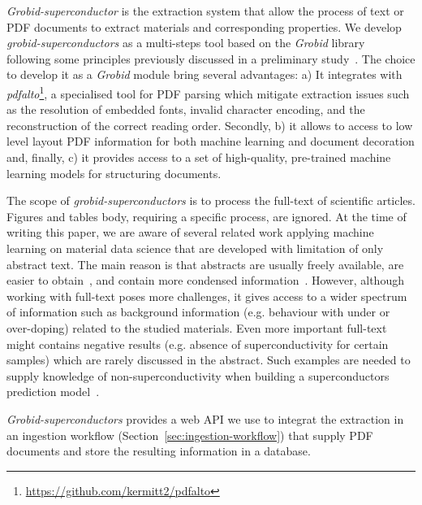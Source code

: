 \documentclass{article}
\begin{document}
\textit{Grobid-superconductor} is the extraction system that allow the process of text or PDF documents to extract materials and corresponding properties. 
We develop \textit{grobid-superconductors} as a multi-steps tool based on the \textit{Grobid} library~\cite{GROBID} following some principles previously discussed in a preliminary study~\cite{foppiano:hal-02870896}.  
The choice to develop it as a \textit{Grobid} module bring several advantages: a) It integrates with \textit{pdfalto}\footnote{\url{https://github.com/kermitt2/pdfalto}}, a specialised tool for PDF parsing which mitigate extraction issues such as the resolution of embedded fonts, invalid character encoding, and the reconstruction of the correct reading order. 
Secondly, b) it allows to access to low level layout PDF information for both machine learning and document decoration and, finally, c) it provides access to a set of high-quality, pre-trained machine learning models for structuring documents.

The scope of \textit{grobid-superconductors} is to process the full-text of scientific articles. Figures and tables body, requiring a specific process, are ignored.
At the time of writing this paper, we are aware of several related work applying machine learning on material data science that are developed with limitation of  only abstract text.
The main reason is that abstracts are usually freely available, are easier to obtain~\cite{kononova_text-mined_2019}, and contain more condensed information~\cite{yamaguchi-etal-2020-sc, court_magnetic_2020}. 
However, although working with full-text poses more challenges, it gives access to a wider spectrum of information such as background information (e.g. behaviour with under or over-doping) related to the studied materials. Even more important full-text might contains negative results (e.g. absence of superconductivity for certain samples) which are rarely discussed in the abstract. 
Such examples are needed to supply knowledge of non-superconductivity when building a superconductors prediction model~\cite{stanev_machine_2017}. 

\textit{Grobid-superconductors} provides a web API we use to integrat the extraction in an ingestion workflow (Section~\ref{sec:ingestion-workflow}) that supply PDF documents and store the resulting information in a database.
\end{document}
